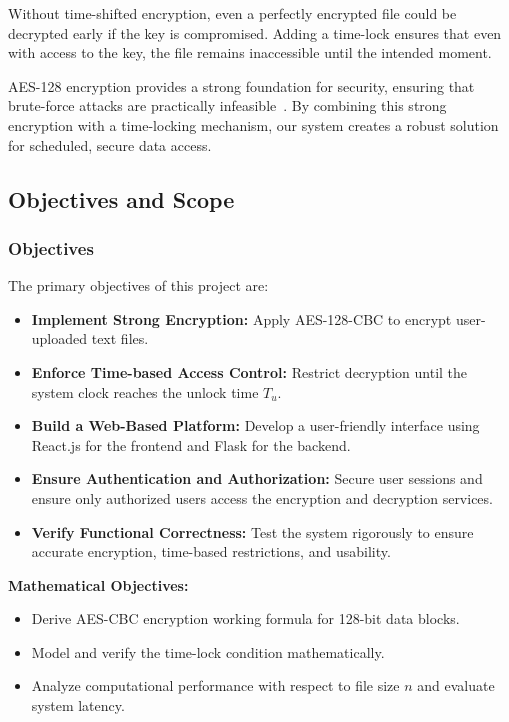 \documentclass[12pt]{article}
\begin{document}
Without time-shifted encryption, even a perfectly encrypted file could be decrypted early if the key is compromised. Adding a time-lock ensures that even with access to the key, the file remains inaccessible until the intended moment.

AES-128 encryption provides a strong foundation for security, ensuring that brute-force attacks are practically infeasible~\cite{hac}. By combining this strong encryption with a time-locking mechanism, our system creates a robust solution for scheduled, secure data access.

\subsection{Objectives and Scope}

\subsubsection{Objectives}

The primary objectives of this project are:
\begin{itemize}
    \item \textbf{Implement Strong Encryption:} Apply AES-128-CBC to encrypt user-uploaded text files.
    \item \textbf{Enforce Time-based Access Control:} Restrict decryption until the system clock reaches the unlock time \( T_u \).
    \item \textbf{Build a Web-Based Platform:} Develop a user-friendly interface using React.js for the frontend and Flask for the backend.
    \item \textbf{Ensure Authentication and Authorization:} Secure user sessions and ensure only authorized users access the encryption and decryption services.
    \item \textbf{Verify Functional Correctness:} Test the system rigorously to ensure accurate encryption, time-based restrictions, and usability.
\end{itemize}

\textbf{Mathematical Objectives:}
\begin{itemize}
    \item Derive AES-CBC encryption working formula for 128-bit data blocks.
    \item Model and verify the time-lock condition mathematically.
    \item Analyze computational performance with respect to file size \( n \) and evaluate system latency.
\end{itemize}
\end{document}
